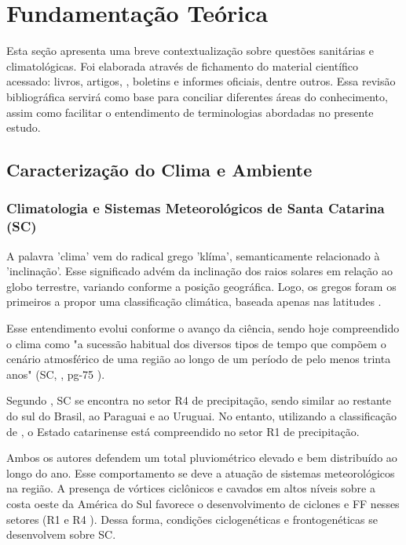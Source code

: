 \chapter{Fundamentação Teórica}

Esta seção apresenta uma breve contextualização sobre questões sanitárias e climatológicas. Foi elaborada através de  fichamento do material científico acessado: livros, artigos, , boletins e informes oficiais, dentre outros. Essa revisão bibliográfica servirá como base para conciliar diferentes áreas do conhecimento, assim como facilitar o entendimento de terminologias abordadas no presente estudo.

\section{Caracterização do Clima e Ambiente}

\subsection{Climatologia e Sistemas Meteorológicos de Santa Catarina (SC)}

\indent A palavra 'clima' vem do radical grego 'klíma', semanticamente relacionado à 'inclinação'. Esse significado advém da inclinação dos raios solares em relação ao globo terrestre, variando conforme a posição geográfica. Logo, os gregos foram os primeiros a propor uma classificação climática, baseada apenas nas latitudes \cite{AtlasClimaticoSul}.

\indent Esse entendimento evolui conforme o avanço da ciência, sendo hoje compreendido o clima como "a sucessão habitual dos diversos tipos de tempo que compõem o cenário atmosférico de uma região ao longo de um período de pelo menos trinta anos" (\acrlong{SC}, \citeyear{AtlasSCnatureza}, pg-75 ).

\indent Segundo , \acrlong{SC} se encontra no setor R4 de precipitação, sendo similar ao restante do sul do Brasil, ao Paraguai e ao Uruguai. No entanto, utilizando a classificação de , o Estado catarinense está compreendido no setor R1 de precipitação.

\indent Ambos os autores defendem um total pluviométrico elevado e bem distribuído ao longo do ano. Esse comportamento se deve a atuação de sistemas meteorológicos na região. A presença de vórtices ciclônicos e cavados em altos níveis sobre a costa oeste da América do Sul favorece o desenvolvimento de ciclones e \acrlong{FF} nesses setores (R1 \cite{MERGEatual} e R4 \cite{reboita2010}). Dessa forma, condições ciclogenéticas e frontogenéticas se desenvolvem sobre \acrlong{SC}.

